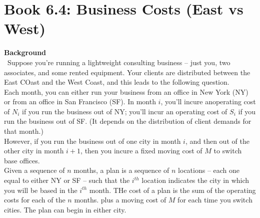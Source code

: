 \documentclass[12pt]{article}
\begin{document}

\newcommand{\hmwkClass}{COS 255}
\newcommand{\hmwkSemester}{Spring 2016}

\newcommand{\hmwkAuthorName}{Lukas Leung}
\newcommand{\hmwkAuthorID}{lleung}

\newcommand{\hmwkAssignmentNum}{5}

\newcommand{\hmwkProblemNum}{4}

\newcommand{\hmwkCollaborators}{}
\thispagestyle{fancycollab}



\section*{Book 6.4: Business Costs (East vs West)}
\textbf{Background} \\
~\indent Suppose you're running a lightweight consulting business -- just you, two associates, and some
rented equipment. Your clients are distributed between the East COast and the West Coast, and this leads
to the following question. \\
\indent Each month, you can either run your business from an office in New York (NY) or from an office
in San Francisco (SF). In month $i$, you'll incure anoperating cost of $N_i$ if you run the business out
of NY; you'll incur an operating cost of $S_i$ if you run the business out of SF. (It depends on the
distribution of client demands for that month.) \\
\indent However, if you run the business out of one city in month $i$, and then out of the other city in
month $i + 1$, then you incure a fixed moving cost of $M$ to switch base offices. \\
\indent Given a sequence of $n$ months, a plan is a sequence of $n$ locations -- each one equal to either
NY or SF -- such that the $i^{th}$ location indicates the city in which you will be based in the $i^{th}$
month. THe cost of a plan is the sum of the operating costs for each of the $n$ months. plus a moving
cost of $M$ for each time you switch cities. The plan can begin in either city.
\end{document}
